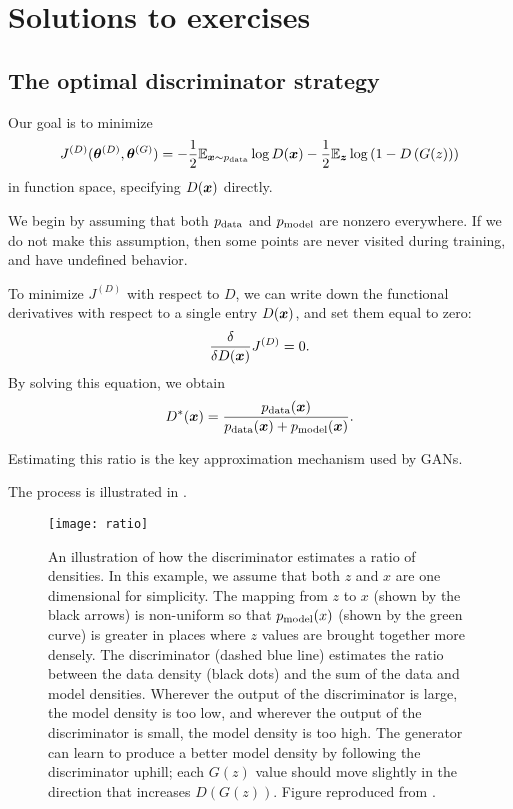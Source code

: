 \section{Solutions to exercises}
\label{sec:solutions}

\subsection{The optimal discriminator strategy}
\label{sec:opt_d_soln}

Our goal is to minimize
\begin{equation}
  J^{(D)}({\bm{\theta}}^{(D)}, {\bm{\theta}}^{(G)}) = -\frac{1}{2} \mathbb{E}_{{\bm{x}} \sim p_{\rm{data}}} \log D({\bm{x}}) - \frac{1}{2} \mathbb{E}_{{\bm{z}}} \log \left(1 - D\left( G(z) \right) \right)
\end{equation}
in function space, specifying $D({\bm{x}})$ directly.

We begin by assuming that both $p_{\rm{data}}$ and $p_{\rm{model}}$ are nonzero everywhere.
If we do not make this assumption, then some points are never visited during training,
and have undefined behavior.

To minimize $J^{(D)}$ with respect to $D$, we can write down the functional derivatives with
respect to a single entry $D({\bm{x}})$, and set them equal to zero:
\[
\frac{\delta} {\delta D({\bm{x}})} J^{(D)} = 0.
\]
By solving this equation, we obtain
\[
D^*({\bm{x}}) = \frac{ p_{\rm{data}}({\bm{x}}) } {p_{\rm{data}}({\bm{x}}) + p_{\rm{model}}({\bm{x}}) }.
\]

Estimating this ratio is the key approximation mechanism used by GANs.

The process is illustrated in .

\begin{figure}
\centering
\texttt{[image: ratio]}
\caption{
An illustration of how the discriminator estimates a ratio of
densities.
In this example, we assume that both $z$ and $x$ are one dimensional
for simplicity.
The mapping from $z$ to $x$ (shown by the black arrows) is non-uniform so that $p_{\rm{model}}(x)$
(shown by the green curve) is
greater in places where $z$ values are brought together more densely.
The discriminator (dashed blue line) estimates the ratio between the data density (black dots)
and the sum of the data and model densities.
Wherever the output of the discriminator is large, the model density is too low, and wherever
the output of the discriminator is small, the model density is too high.
The generator can learn to produce a better model density by following the discriminator uphill;
each $G(z)$ value should move slightly in the direction that increases $D(G(z))$.
Figure reproduced from \citet{Goodfellow-et-al-NIPS2014-small}.
}
\label{fig:ratio}
\end{figure}


